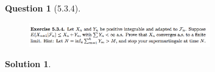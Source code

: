 \documentclass[11pt]{article}
\theoremstyle{plain}
\theoremstyle{quest}
\newtheorem*{question}{Question}
\newtheorem*{solution}{Solution}
\begin{document}
\newpage

\begin{question}[5.3.4]
\hfill
\begin{figure}[h!]
  \centering
    \includegraphics[width=0.7\textwidth]{d-5-3-4.png}
\end{figure}
\end{question}
\begin{solution} \hfill \\

\end{solution}
\end{document}
